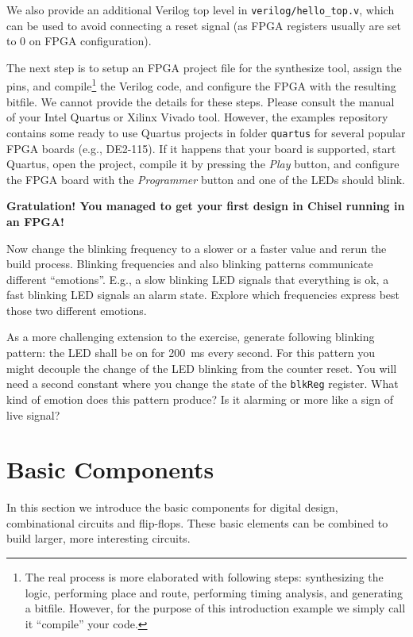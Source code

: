 \documentclass[%
    10pt, %
    headinclude, footexclude,
    openright, %
    notitlepage,
    cleardoubleempty,
    headsepline,
    pointlessnumbers,
    bibtotoc, idxtotoc,
    ]{scrbook}
\newcommand{\code}[1]{{\small{\texttt{#1}}}}
\begin{document}
We also provide an additional Verilog top level in \code{verilog/hello\_top.v},
which can be used to avoid connecting a reset signal (as FPGA registers usually
are set to 0 on FPGA configuration).

The next step is to setup an FPGA project file for the synthesize tool, assign the pins,
and compile\footnote{The real process is more elaborated with following steps: synthesizing the logic,
performing place and route, performing timing analysis, and generating a bitfile.
However, for the purpose of this introduction example we simply call it ``compile''
your code.} the Verilog code, and configure the FPGA with the resulting bitfile.
We cannot provide the details for these steps. Please consult the manual of
your Intel Quartus or Xilinx Vivado tool.
However, the examples repository contains some ready to use Quartus
projects in folder \code{quartus} for several popular FPGA boards (e.g., DE2-115).
If it happens that your board is supported, start Quartus, open the project,
compile it by pressing the \emph{Play} button, and configure the FPGA board
with the \emph{Programmer} button and one of the LEDs should blink.

{\bf Gratulation! You managed to get your first design in Chisel running in an FPGA!}

Now change the blinking frequency to a slower or a faster value and
rerun the build process. Blinking frequencies and also blinking patterns
communicate different ``emotions''. E.g., a slow blinking LED signals that
everything is ok, a fast blinking LED signals an alarm state.
Explore which frequencies express best those two different emotions.

As a more challenging extension to the exercise, generate following blinking pattern:
the LED shall be on for 200~ms every second. For this pattern you might
decouple the change of the LED blinking from the counter reset.
You will need a second constant where you change the state of the
\code{blkReg} register. What kind of emotion does this pattern produce?
Is it alarming or more like a sign of live signal?




\chapter{Basic Components}

In this section we introduce the basic components for digital design,
combinational circuits and flip-flops.
These basic elements can be combined to build larger, more interesting
circuits.
\end{document}
